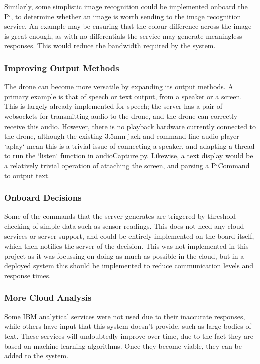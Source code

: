 \documentclass{article}
\begin{document}
Similarly, some simplistic image recognition could be implemented onboard the Pi, to determine whether an image is worth sending to the image recognition service. An example may be ensuring that the colour difference across the image is great enough, as with no differentials the service may generate meaningless responses. This would reduce the bandwidth required by the system.

\subsubsection{Improving Output Methods} \label{OutputMethods}
The drone can become more versatile by expanding its output methods. A primary example is that of speech or text output, from a speaker or a screen. This is largely already implemented for speech; the server has a pair of websockets for transmitting audio to the drone, and the drone can correctly receive this audio. However, there is no playback hardware currently connected to the drone, although the existing 3.5mm jack and command-line audio player `aplay` mean this is a trivial issue of connecting a speaker, and adapting a thread to run the `listen` function in audioCapture.py. Likewise, a text display would be a relatively trivial operation of attaching the screen, and parsing a PiCommand to output text. 

\subsubsection{Onboard Decisions}
Some of the commands that the server generates are triggered by threshold checking of simple data such as sensor readings. This does not need any cloud services or server support, and could be entirely implemented on the board itself, which then notifies the server of the decision. This was not implemented in this project as it was focussing on doing as much as possible in the cloud, but in a deployed system this should be implemented to reduce communication levels and response times. 

\subsubsection{More Cloud Analysis}
Some IBM analytical services were not used due to their inaccurate responses, while others have input that this system doesn't provide, such as large bodies of text. These services will undoubtedly improve over time, due to the fact they are based on machine learning algorithms. Once they become viable, they can be added to the system.
 
\end{document}
